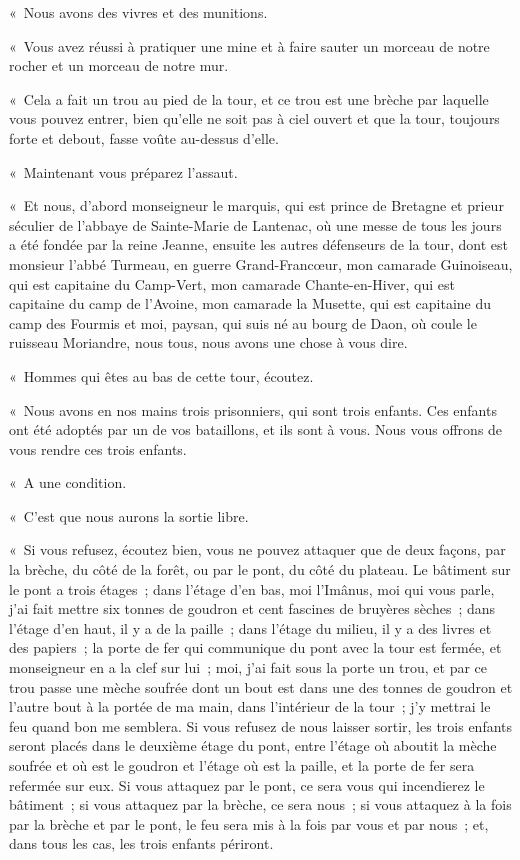 \documentclass[french,twoside]{book} %
\begin{document}
« Nous avons des vivres et des munitions.\par
« Vous avez réussi à pratiquer une mine et à faire sauter un morceau de notre rocher et un morceau de notre mur.\par
« Cela a fait un trou au pied de la tour, et ce trou est une brèche par laquelle vous pouvez entrer, bien qu’elle ne soit pas à ciel ouvert et que la tour, toujours forte et debout, fasse voûte au-dessus d’elle.\par
« Maintenant vous préparez l’assaut.\par
« Et nous, d’abord monseigneur le marquis, qui est prince de Bretagne et prieur séculier de l’abbaye de Sainte-Marie de Lantenac, où une messe de tous les jours a été fondée par la reine Jeanne, ensuite les autres défenseurs de la tour, dont est monsieur l’abbé Turmeau, en guerre Grand-Francœur, mon camarade Guinoiseau, qui est capitaine du Camp-Vert, mon camarade Chante-en-Hiver, qui est capitaine du camp  de l’Avoine, mon camarade la Musette, qui est capitaine du camp des Fourmis et moi, paysan, qui suis né au bourg de Daon, où coule le ruisseau Moriandre, nous tous, nous avons une chose à vous dire.\par
« Hommes qui êtes au bas de cette tour, écoutez.\par
« Nous avons en nos mains trois prisonniers, qui sont trois enfants. Ces enfants ont été adoptés par un de vos bataillons, et ils sont à vous. Nous vous offrons de vous rendre ces trois enfants.\par
« A une condition.\par
« C’est que nous aurons la sortie libre.\par
« Si vous refusez, écoutez bien, vous ne pouvez attaquer que de deux façons, par la brèche, du côté de la forêt, ou par le pont, du côté du plateau. Le bâtiment sur le pont a trois étages ; dans l’étage d’en bas, moi l’Imânus, moi qui vous parle, j’ai fait mettre six tonnes de goudron et cent fascines de bruyères sèches ; dans l’étage d’en haut, il y a de la paille ; dans l’étage du milieu, il y a des livres et des papiers ; la porte de fer qui communique du pont avec la tour est fermée, et monseigneur en a la clef sur lui ; moi, j’ai fait sous la porte un trou, et par ce trou passe une mèche soufrée dont un bout est dans une des tonnes de goudron et l’autre bout à la portée de ma main, dans l’intérieur de la tour ; j’y mettrai le feu quand bon me semblera. Si vous refusez de nous laisser sortir, les trois enfants seront placés dans le deuxième étage du pont, entre l’étage où aboutit la mèche soufrée et où est le goudron et l’étage où est la paille, et la porte de fer sera refermée sur eux. Si vous attaquez par le pont, ce sera  vous qui incendierez le bâtiment ; si vous attaquez par la brèche, ce sera nous ; si vous attaquez à la fois par la brèche et par le pont, le feu sera mis à la fois par vous et par nous ; et, dans tous les cas, les trois enfants périront.\par
\end{document}
